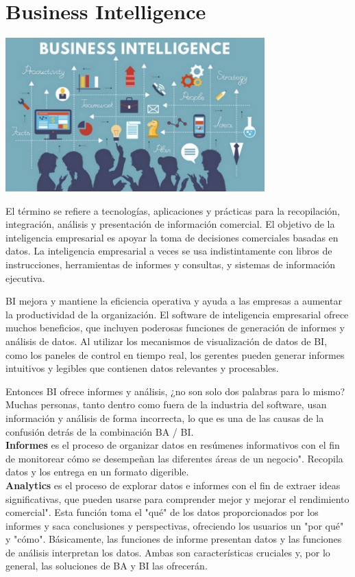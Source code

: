 \section{Business Intelligence} 
\vspace{16mm} %
\begin{center}
\includegraphics[width=10cm]{./Imagenes/001}
\end{center}	
\vspace{12mm} %

El término se refiere a tecnologías, aplicaciones y prácticas para la recopilación, integración, análisis y presentación de información comercial. El objetivo de la inteligencia empresarial es apoyar la toma de decisiones comerciales basadas en datos. La inteligencia empresarial a veces se usa indistintamente con libros de instrucciones, herramientas de informes y consultas, y sistemas de información ejecutiva.

BI mejora y mantiene la eficiencia operativa y ayuda a las empresas a aumentar la productividad de la organización. El software de inteligencia empresarial ofrece muchos beneficios, que incluyen poderosas funciones de generación de informes y análisis de datos. Al utilizar los mecanismos de visualización de datos de BI, como los paneles de control en tiempo real, los gerentes pueden generar informes intuitivos y legibles que contienen datos relevantes y procesables.

Entonces BI ofrece informes y análisis, ¿no son solo dos palabras para lo mismo? Muchas personas, tanto dentro como fuera de la industria del software, usan información y análisis de forma incorrecta, lo que es una de las causas de la confusión detrás de la combinación BA / BI.\\

\textbf{Informes} es el proceso de organizar datos en resúmenes informativos con el fin de monitorear cómo se desempeñan las diferentes áreas de un negocio". Recopila datos y los entrega en un formato digerible.\\

\textbf{Analytics} es el proceso de explorar datos e informes con el fin de extraer ideas significativas, que pueden usarse para comprender mejor y mejorar el rendimiento comercial". Esta función toma el "qué" de los datos proporcionados por los informes y saca conclusiones y perspectivas, ofreciendo los usuarios un "por qué" y "cómo". Básicamente, las funciones de informe presentan datos y las funciones de análisis interpretan los datos. Ambas son características cruciales y, por lo general, las soluciones de BA y BI las ofrecerán.
	


